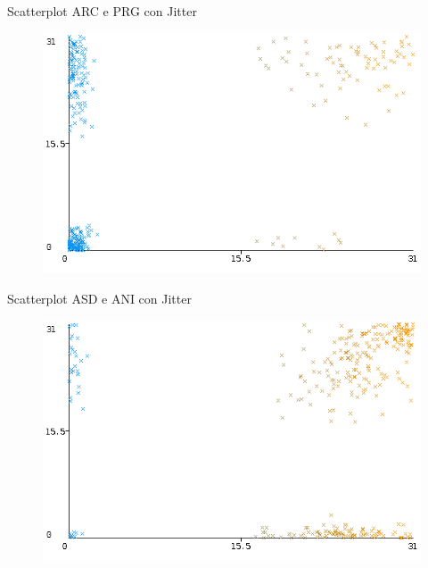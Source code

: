 \documentclass{beamer}
\begin{document}
  \begin{frame}{Scatterplot ARC e PRG con Jitter}
    \begin{figure}[bt]
      \begin{center}
        \includegraphics[width=\textwidth]{../img/arcPrgWeka.png}
      \end{center}
    \end{figure}
  \end{frame}

  \begin{frame}{Scatterplot ASD e ANI con Jitter}
    \begin{figure}[bt]
      \begin{center}
        \includegraphics[width=\textwidth]{../img/asdAniWeka.png}
      \end{center}
    \end{figure}
  \end{frame}
\end{document}
